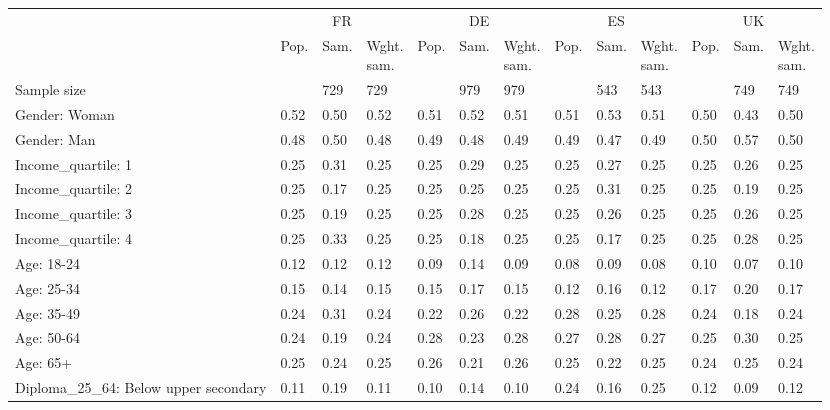 
\begin{tabular}[t]{lllllllllllll}
\toprule
\multicolumn{1}{c}{} & \multicolumn{3}{c}{FR} & \multicolumn{3}{c}{DE} & \multicolumn{3}{c}{ES} & \multicolumn{3}{c}{UK} \\
\cmidrule(l{3pt}r{3pt}){2-4} \cmidrule(l{3pt}r{3pt}){5-7} \cmidrule(l{3pt}r{3pt}){8-10} \cmidrule(l{3pt}r{3pt}){11-13}
  & Pop. & Sam. & \makecell{Wght.\\sam.} & Pop. & Sam. & \makecell{Wght.\\sam.} & Pop. & Sam. & \makecell{Wght.\\sam.} & Pop. & Sam. & \makecell{Wght.\\sam.}\\
\midrule
Sample size &  & 729 & 729 &  & 979 & 979 &  & 543 & 543 &  & 749 & 749\\
\addlinespace
Gender: Woman & 0.52 & 0.50 & 0.52 & 0.51 & 0.52 & 0.51 & 0.51 & 0.53 & 0.51 & 0.50 & 0.43 & 0.50\\
Gender: Man & 0.48 & 0.50 & 0.48 & 0.49 & 0.48 & 0.49 & 0.49 & 0.47 & 0.49 & 0.50 & 0.57 & 0.50\\
\addlinespace
Income\_quartile: 1 & 0.25 & 0.31 & 0.25 & 0.25 & 0.29 & 0.25 & 0.25 & 0.27 & 0.25 & 0.25 & 0.26 & 0.25\\
Income\_quartile: 2 & 0.25 & 0.17 & 0.25 & 0.25 & 0.25 & 0.25 & 0.25 & 0.31 & 0.25 & 0.25 & 0.19 & 0.25\\
Income\_quartile: 3 & 0.25 & 0.19 & 0.25 & 0.25 & 0.28 & 0.25 & 0.25 & 0.26 & 0.25 & 0.25 & 0.26 & 0.25\\
Income\_quartile: 4 & 0.25 & 0.33 & 0.25 & 0.25 & 0.18 & 0.25 & 0.25 & 0.17 & 0.25 & 0.25 & 0.28 & 0.25\\
\addlinespace
Age: 18-24 & 0.12 & 0.12 & 0.12 & 0.09 & 0.14 & 0.09 & 0.08 & 0.09 & 0.08 & 0.10 & 0.07 & 0.10\\
Age: 25-34 & 0.15 & 0.14 & 0.15 & 0.15 & 0.17 & 0.15 & 0.12 & 0.16 & 0.12 & 0.17 & 0.20 & 0.17\\
Age: 35-49 & 0.24 & 0.31 & 0.24 & 0.22 & 0.26 & 0.22 & 0.28 & 0.25 & 0.28 & 0.24 & 0.18 & 0.24\\
Age: 50-64 & 0.24 & 0.19 & 0.24 & 0.28 & 0.23 & 0.28 & 0.27 & 0.28 & 0.27 & 0.25 & 0.30 & 0.25\\
Age: 65+ & 0.25 & 0.24 & 0.25 & 0.26 & 0.21 & 0.26 & 0.25 & 0.22 & 0.25 & 0.24 & 0.25 & 0.24\\
\addlinespace
Diploma\_25\_64: Below upper secondary & 0.11 & 0.19 & 0.11 & 0.10 & 0.14 & 0.10 & 0.24 & 0.16 & 0.25 & 0.12 & 0.09 & 0.12\\

\end{tabular}
